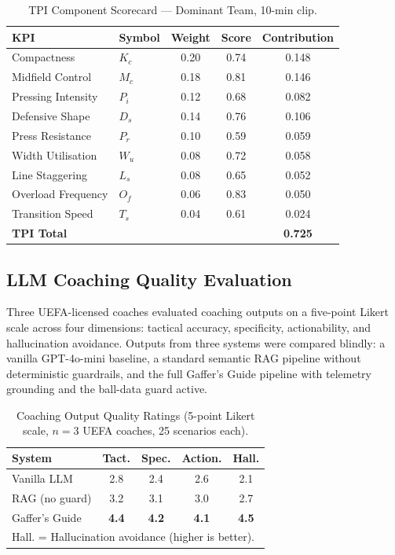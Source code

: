 \documentclass[conference]{IEEEtran}
\begin{document}
\begin{table}[!t]
\centering
\caption{TPI Component Scorecard --- Dominant Team, 10-min clip.}
\label{tab:tpi_breakdown}
\setlength{\tabcolsep}{4pt}
\begin{tabular}{llccc}
\toprule
\textbf{KPI} & \textbf{Symbol} & \textbf{Weight} & \textbf{Score} & \textbf{Contribution} \\
\midrule
Compactness          & $K_c$ & 0.20 & 0.74 & 0.148 \\
Midfield Control     & $M_c$ & 0.18 & 0.81 & 0.146 \\
Pressing Intensity   & $P_i$ & 0.12 & 0.68 & 0.082 \\
Defensive Shape      & $D_s$ & 0.14 & 0.76 & 0.106 \\
Press Resistance     & $P_r$ & 0.10 & 0.59 & 0.059 \\
Width Utilisation    & $W_u$ & 0.08 & 0.72 & 0.058 \\
Line Staggering      & $L_s$ & 0.08 & 0.65 & 0.052 \\
Overload Frequency   & $O_f$ & 0.06 & 0.83 & 0.050 \\
Transition Speed     & $T_s$ & 0.04 & 0.61 & 0.024 \\
\midrule
\textbf{TPI Total}   &       &      &      & \textbf{0.725} \\
\bottomrule
\end{tabular}
\end{table}

\subsection{LLM Coaching Quality Evaluation}

Three UEFA-licensed coaches evaluated coaching outputs on a five-point Likert scale across four dimensions: tactical accuracy, specificity, actionability, and hallucination avoidance. Outputs from three systems were compared blindly: a vanilla GPT-4o-mini baseline, a standard semantic RAG pipeline without deterministic guardrails, and the full Gaffer's Guide pipeline with telemetry grounding and the ball-data guard active.

\begin{table}[!t]
\centering
\caption{Coaching Output Quality Ratings (5-point Likert scale, $n = 3$ UEFA coaches, 25 scenarios each).}
\label{tab:coaching}
\setlength{\tabcolsep}{4pt}
\begin{tabular}{lcccc}
\toprule
\textbf{System} & \textbf{Tact.} & \textbf{Spec.} & \textbf{Action.} & \textbf{Hall.} \\
\midrule
Vanilla LLM         & 2.8 & 2.4 & 2.6 & 2.1 \\
RAG (no guard)      & 3.2 & 3.1 & 3.0 & 2.7 \\
Gaffer's Guide      & \textbf{4.4} & \textbf{4.2} & \textbf{4.1} & \textbf{4.5} \\
\midrule
\multicolumn{5}{l}{\footnotesize Hall. = Hallucination avoidance (higher is better).}\\
\end{tabular}
\end{table}
\end{document}
